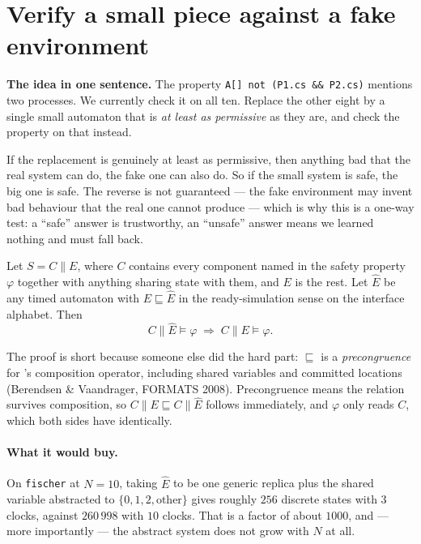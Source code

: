 \section{Verify a small piece against a fake environment \hfill \live{}}

\textbf{The idea in one sentence.} The property \texttt{A[] not (P1.cs \&\& P2.cs)} mentions two
processes. We currently check it on all ten. Replace the other eight by a single small automaton
that is \emph{at least as permissive} as they are, and check the property on that instead.

If the replacement is genuinely at least as permissive, then anything bad that the real system can
do, the fake one can also do. So if the small system is safe, the big one is safe. The reverse is
not guaranteed --- the fake environment may invent bad behaviour that the real one cannot produce
--- which is why this is a one-way test: a ``safe'' answer is trustworthy, an ``unsafe'' answer
means we learned nothing and must fall back.

\begin{theorem}
Let $S = C \parallel E$, where $C$ contains every component named in the safety property $\varphi$
together with anything sharing state with them, and $E$ is the rest. Let $\hat{E}$ be any timed
automaton with $E \sqsubseteq \hat{E}$ in the ready-simulation sense on the interface alphabet.
Then
\[
  C \parallel \hat{E} \models \varphi \;\Longrightarrow\; C \parallel E \models \varphi .
\]
\end{theorem}

The proof is short because someone else did the hard part: $\sqsubseteq$ is a \emph{precongruence}
for \uppaal{}'s composition operator, including shared variables and committed locations
(Berendsen \& Vaandrager, FORMATS 2008). Precongruence means the relation survives composition, so
$C \parallel E \sqsubseteq C \parallel \hat E$ follows immediately, and $\varphi$ only reads $C$,
which both sides have identically.

\paragraph{What it would buy.} On \texttt{fischer} at $N=10$, taking $\hat E$ to be one generic
replica plus the shared variable abstracted to $\{0, 1, 2, \text{other}\}$ gives roughly $256$
discrete states with $3$ clocks, against $260\,998$ with $10$ clocks. That is a factor of about
$1000$, and --- more importantly --- the abstract system does not grow with $N$ at all.

